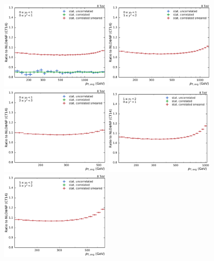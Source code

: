 \begin{figure}[htp]
    \centering
    \includegraphics[width=0.47\textwidth]{figures/measurement/unf_nlo_check_yb0ys0.pdf}\hfill
    \includegraphics[width=0.47\textwidth]{figures/measurement/unf_nlo_check_yb0ys1.pdf}
    \includegraphics[width=0.47\textwidth]{figures/measurement/unf_nlo_check_yb0ys2.pdf}\hfill
    \includegraphics[width=0.47\textwidth]{figures/measurement/unf_nlo_check_yb1ys0.pdf}
    \includegraphics[width=0.47\textwidth]{figures/measurement/unf_nlo_check_yb1ys1.pdf}\hfill

\end{figure}
